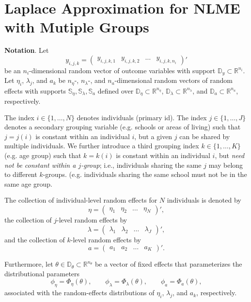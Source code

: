 \documentclass[12pt]{article}
\title{}
\author{Manuel Huth}
\date{}
\begin{document}
\section*{Laplace Approximation for NLME with Mutiple Groups}


\textbf{Notation}. Let 
\[
y_{i,j,k}=\begin{pmatrix}y_{i,j,k,1}&y_{i,j,k,2}&\hdots&y_{i,j,k,n_i}\end{pmatrix}'
\]
be an \(n_i\)-dimensional random vector of outcome variables with support \(\mathbb{D}_y\subset\mathbb{R}^{n_i}\). Let \(\eta_i\), \(\lambda_j\), and \(a_k\) be \(n_\eta\)-, \(n_\lambda\)-, and \(n_a\)-dimensional random vectors of random effects with supports \(\mathbb{S}_\eta,\mathbb{S}_\lambda,\mathbb{S}_a\) defined over \(\mathbb{D}_\eta\subset\mathbb{R}^{n_\eta}\), \(\mathbb{D}_\lambda\subset\mathbb{R}^{n_\lambda}\), and \(\mathbb{D}_a\subset\mathbb{R}^{n_a}\), respectively.

The index \(i\in\{1,\dots,N\}\) denotes individuals (primary id). The index \(j\in\{1,\dots,J\}\) denotes a secondary grouping variable (e.g. schools or areas of living) such that \(j=j(i)\) is constant within an individual \(i\), but a given \(j\) can be shared by multiple individuals. We further introduce a third grouping index \(k\in\{1,\dots,K\}\) (e.g. age group) such that \(k=k(i)\) is constant within an individual \(i\), but \emph{need not be constant within a \(j\)-group}; i.e., individuals sharing the same \(j\) may belong to different \(k\)-groups. (e.g. individuals sharing the same school must not be in the same age group.

The collection of individual-level random effects for \(N\) individuals is denoted by
\[
\eta=\begin{pmatrix}\eta_1&\eta_2&\hdots&\eta_N\end{pmatrix}',
\]
the collection of \(j\)-level random effects by
\[
\lambda=\begin{pmatrix}\lambda_1&\lambda_2&\hdots&\lambda_J\end{pmatrix}',
\]
and the collection of \(k\)-level random effects by
\[
a=\begin{pmatrix}a_1&a_2&\hdots&a_K\end{pmatrix}'.
\]

Furthermore, let \(\theta\in\mathbb{D}_\theta\subset\mathbb{R}^{n_\theta}\) be a vector of fixed effects that parameterizes the distributional parameters
\[
\phi_\eta=\Phi_\eta(\theta),\qquad 
\phi_\lambda=\Phi_\lambda(\theta),\qquad
\phi_a=\Phi_a(\theta),
\]
associated with the random-effects distributions of \(\eta_i\), \(\lambda_j\), and \(a_k\), respectively.
\end{document}

